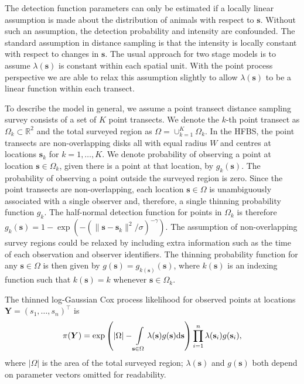 \documentclass{statsoc}
\newcommand{\bs}{\mathbf{s}}
\newcommand{\bm}{\boldsymbol}  %
\begin{document}
The detection function parameters can only be estimated if a locally linear
assumption is made about the distribution of animals with respect to $\bs$.
Without such an assumption, the detection probability and intensity are confounded.
The standard assumption in distance sampling is that the intensity is locally
constant with respect to changes in $\bs$. The usual approach for two stage models is
to assume $\lambda(\bs)$ is constant within each spatial unit.  With the point
process perspective we are able to relax this assumption slightly to allow
$\lambda(\bs)$ to be a linear function within each transect.

To describe the model in general, we assume a point transect distance sampling survey consists of a set of $K$ point transects.   We denote the $k$-th point transect as $\Omega_k \subset \mathbb{R}^2$ and the total surveyed region as $\Omega = \cup_{k=1}^K \Omega_k$.  In the HFBS, the point transects are non-overlapping disks all with equal radius $W$ and centres at locations $\bs_k$ for $k = 1, \ldots, K$.  We denote probability of observing a point at location $\bs \in \Omega_k$, given there is a point at that location, by $g_k(\bs)$.  The probability of observing a point outside the surveyed region is zero.
Since the point transects are non-overlapping, each location $\bs \in \Omega$ is unambiguously associated with a single observer and, therefore, a single thinning probability function $g_k$.   The half-normal detection function for points in $\Omega_k$ is therefore $g_k(\bs) = 1- \exp(- (\lVert \bs - \bs_k \rVert^2 / \sigma) ^{-\gamma})$.  The assumption of non-overlapping survey regions could be relaxed by including extra information such as the time of each observation and observer identifiers.  The thinning probability function for any $\bs \in \Omega$ is then given by $g(\bs) = g_{k(\bs)}(\bs)$, where $k(\bs)$ is an indexing function such that $k(\bs) = k$ whenever $\bs \in \Omega_k$.

The thinned log-Gaussian Cox process likelihood for observed points at locations $\bm{Y} = (s_1, \ldots, s_n)^\intercal$ is
\begin{equation}
\label{lgcp-likelihood}
\pi(\bm{Y}) = \exp\left( |\Omega| -\int\displaylimits_{\bs \in \Omega} \lambda(\bs) g(\bs) \mathrm{d}\bs \right)\prod_{i=1}^n \lambda(\bs_i)g(\bs_i),
\end{equation}
where $|\Omega|$ is the area of the total surveyed region; $\lambda(\bs)$ and $g(\bs)$ both depend on parameter vectors omitted for readability.
\end{document}

